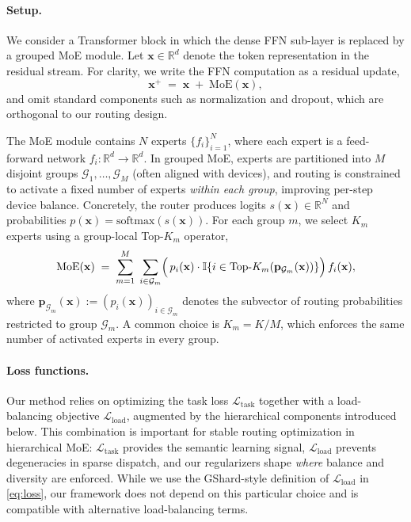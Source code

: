 \documentclass[sigconf,nonacm]{acmart}
\begin{document}
\paragraph{Setup.} We consider a Transformer block in which the dense FFN sub-layer is replaced by a grouped MoE module.
Let $\mathbf{x} \in \mathbb{R}^d$ denote the token representation in the residual stream.
For clarity, we write the FFN computation as a residual update,
\[
\mathbf{x}^{+} \;=\; \mathbf{x} \;+\; \mathrm{MoE}(\mathbf{x}),
\]
and omit standard components such as normalization and dropout, which are orthogonal to our routing design.

The MoE module contains $N$ experts $\{f_i\}_{i=1}^N$, where each expert is a feed-forward network $f_i:\mathbb{R}^d \rightarrow \mathbb{R}^d$.
In grouped MoE, experts are partitioned into $M$ disjoint groups
$\mathcal{G}_1, \ldots, \mathcal{G}_M$ (often aligned with devices),
and routing is constrained to activate a fixed number of experts \emph{within each group}, improving per-step device balance.
Concretely, the router produces logits $s(\mathbf{x}) \in \mathbb{R}^N$ and probabilities $p(\mathbf{x})=\mathrm{softmax}(s(\mathbf{x}))$.
For each group $m$, we select $K_m$ experts using a group-local Top-$K_m$ operator,
\begin{equation*}
\mathrm{MoE}(\mathbf{x})
\;=\;
\sum_{m=1}^{M}\;\sum_{i \in \mathcal{G}_m}
\Bigl(\, p_i(\mathbf{x})\cdot \mathbb{I}\{ i \in \mathrm{Top}\text{-}K_m(\mathbf{p}_{\mathcal{G}_m}(\mathbf{x})) \}\Bigr)\, f_i(\mathbf{x}),
\end{equation*}
where $\mathbf{p}_{\mathcal{G}_m}(\mathbf{x}) := (p_i(\mathbf{x}))_{i\in\mathcal{G}_m}$ denotes the subvector of routing probabilities restricted to group $\mathcal{G}_m$.
A common choice is $K_m = K/M$, which enforces the same number of activated experts in every group.

\paragraph{Loss functions.} Our method relies on optimizing the task loss $\mathcal{L}_{\text{task}}$ together with a load-balancing objective $\mathcal{L}_{\text{load}}$, augmented by the hierarchical components introduced below.
This combination is important for stable routing optimization in hierarchical MoE: $\mathcal{L}_{\text{task}}$ provides the semantic learning signal, $\mathcal{L}_{\text{load}}$ prevents degeneracies in sparse dispatch, and our regularizers shape \emph{where} balance and diversity are enforced.
While we use the GShard-style definition of $\mathcal{L}_{\text{load}}$ in \eqref{eq:loss}, our framework does not depend on this particular choice and is compatible with alternative load-balancing terms.
\end{document}
